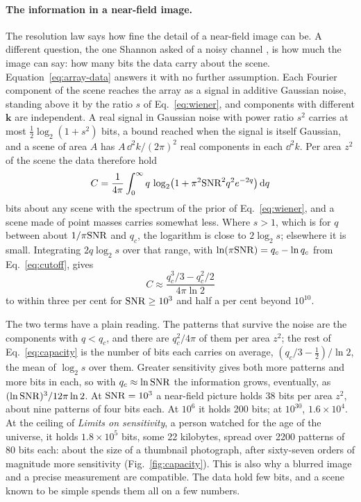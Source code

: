\paragraph{The information in a near-field image.} The resolution law says how fine the
detail of a near-field image can be. A different question, the one Shannon
asked of a noisy channel \cite{Shannon1948}, is how much the image can say:
how many bits the data carry about the scene. Equation~\eqref{eq:array-data}
answers it with no further assumption. Each Fourier component of the scene
reaches the array as a signal in additive Gaussian noise, standing above it by
the ratio $s$ of Eq.~\eqref{eq:wiener}, and components with different
$\mathbf k$ are independent. A real signal in Gaussian noise with power ratio
$s^2$ carries at most $\tfrac12\log_2(1+s^2)$ bits, a bound reached when the
signal is itself Gaussian, and a scene of area $A$ has $A\,\dd^2k/(2\pi)^2$
real components in each $\dd^2k$. Per area $z^2$ of the scene the data
therefore hold
\begin{equation}\label{eq:capacity-integral}
C = \frac{1}{4\pi}\int_0^\infty q\,\log_2\!\left(1 + \pi^2\mathrm{SNR}^2 q^2 e^{-2q}\right)\mathrm{d} q
\end{equation}
bits about any scene with the spectrum of the prior of Eq.~\eqref{eq:wiener},
and a scene made of point masses carries somewhat less. Where $s > 1$, which
is for $q$ between about $1/\pi\mathrm{SNR}$ and $q_c$, the logarithm is close to
$2\log_2 s$; elsewhere it is small. Integrating $2q\log_2 s$ over that range,
with $\ln(\pi\mathrm{SNR}) = q_c - \ln q_c$ from Eq.~\eqref{eq:cutoff}, gives
\begin{equation}\label{eq:capacity}
C \approx \frac{q_c^3/3 - q_c^2/2}{4\pi\ln 2}
\end{equation}
to within three per cent for $\mathrm{SNR} \ge 10^3$ and half a per cent beyond
$10^{10}$.

The two terms have a plain reading. The patterns that survive the noise are
the components with $q < q_c$, and there are $q_c^2/4\pi$ of them per area
$z^2$; the rest of Eq.~\eqref{eq:capacity} is the number of bits each carries
on average, $(q_c/3 - \tfrac12)/\ln 2$, the mean of $\log_2 s$ over them.
Greater sensitivity gives both more patterns and more bits in each, so with
$q_c \approx \ln\mathrm{SNR}$ the information grows, eventually, as
$(\ln\mathrm{SNR})^3/12\pi\ln 2$. At
$\mathrm{SNR} = 10^3$ a near-field picture holds 38 bits per area $z^2$, about nine
patterns of four bits each. At $10^6$ it holds 200 bits; at $10^{30}$,
$1.6\times10^4$. At the ceiling of \emph{Limits on sensitivity}, a person
watched for the age of the universe, it holds $1.8\times10^5$ bits, some 22
kilobytes, spread over 2200 patterns of 80 bits each: about the size of a
thumbnail photograph, after sixty-seven orders of magnitude more sensitivity
(Fig.~\ref{fig:capacity}). This is also why a blurred image and a precise
measurement are compatible. The data hold few bits, and a scene known to be
simple spends them all on a few numbers.

